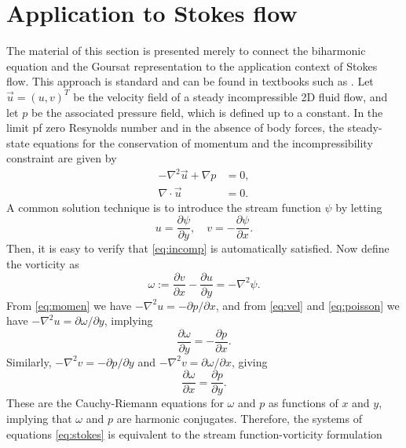 
\section{Application to Stokes flow \label{sec:physics}}
The material of this section is presented merely to connect the biharmonic equation and the
Goursat representation to the application context of Stokes flow. This approach is standard and can be found in textbooks such as \cite{ockendon95}. Let $\vec{u}=(u,v)^T$ be the velocity field of a steady incompressible 2D fluid flow, and let $p$ be the associated pressure field, which is defined up to a constant. In the limit pf zero Resynolds number and in the absence of body forces, the steady-state equations for the conservation of momentum and the incompressibility constraint are given by
\begin{subequations}\label{eq:stokes}
\begin{align}
-\nabla^2 \vec{u} + \nabla p &= 0,\label{eq:momen}\\
\nabla\cdot\vec{u} &= 0. \label{eq:incomp}
\end{align}
\end{subequations}
A common solution technique is to introduce the stream function $\psi$ by letting
\begin{equation}\label{eq:vel}
u=\frac{\partial\psi}{\partial y}, \quad 
v=-\frac{\partial\psi}{\partial x}.
\end{equation}
Then, it is easy to verify that \eqref{eq:incomp} is automatically satisfied. Now define the vorticity as
\begin{equation} \label{eq:poisson}
\omega := \frac{\partial v}{\partial x} - \frac{\partial u}{\partial y}  = -\nabla^2 \psi.
\end{equation}
From \eqref{eq:momen} we have $-\nabla^2 u = -\partial p/\partial x$, and from \eqref{eq:vel} and \eqref{eq:poisson} we have $-\nabla^2 u =\partial\omega/\partial y$, implying 
\begin{equation}
\frac{\partial \omega}{\partial y} = -\frac{\partial p}{\partial x}.
\end{equation}
Similarly, $-\nabla^2 v=-\partial p/\partial y$ and $-\nabla^2 v =\partial \omega/\partial x$, giving
\begin{equation}
\frac{\partial\omega}{\partial x}=\frac{\partial p}{\partial y}.
\end{equation}
These are the Cauchy-Riemann equations for $\omega$ and $p$ as functions of $x$ and $y$, implying that $\omega$ and $p$ are harmonic conjugates. Therefore, the systems of equations \eqref{eq:stokes} is equivalent to the stream function-vorticity formulation

